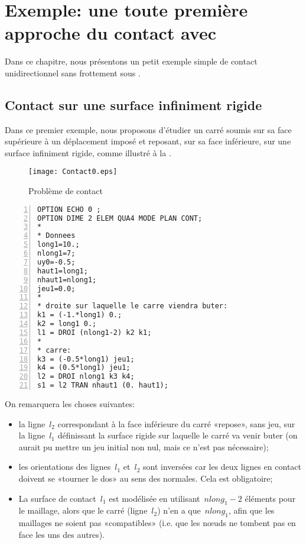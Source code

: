 \section{Exemple: une toute première approche du contact avec \castem}

Dans ce chapitre, nous présentons un petit exemple simple de contact unidirectionnel sans frottement sous \castem.

\medskip
\subsection{Contact sur une surface infiniment rigide}

Dans ce premier exemple, nous proposons d'étudier un carré soumis sur sa face supérieure à un déplacement imposé et reposant, sur sa face inférieure, sur une surface infiniment rigide, comme illustré à la .
\begin{figure}[ht]
  \center
  \texttt{[image: Contact0.eps]}
  \caption{\label{Fig-Cont0} Problème de contact}
\end{figure}

\color{gris}\scriptsize
\begin{multicols}{2}
\begin{Verbatim}[numbers=left,numbersep=3pt]
OPTION ECHO 0 ;
OPTION DIME 2 ELEM QUA4 MODE PLAN CONT;
*
* Donnees
long1=10.;
nlong1=7;
uy0=-0.5;
haut1=long1;
nhaut1=nlong1;
jeu1=0.0;
*
* droite sur laquelle le carre viendra buter:
k1 = (-1.*long1) 0.;
k2 = long1 0.;
l1 = DROI (nlong1-2) k2 k1;
*
* carre:
k3 = (-0.5*long1) jeu1;
k4 = (0.5*long1) jeu1;
l2 = DROI nlong1 k3 k4;
s1 = l2 TRAN nhaut1 (0. haut1);
\end{Verbatim}
\end{multicols}
\color{black}\normalsize

\medskip
On remarquera les choses suivantes:
\begin{itemize}
  \item la ligne~$l_2$ correspondant à la face inférieure du carré «repose», sans jeu, sur la ligne~$l_1$ définissant la surface rigide sur laquelle le carré va venir buter (on aurait pu mettre un jeu initial non nul, mais ce n'est pas nécessaire);
  \item les orientations des lignes~$l_1$ et~$l_2$ sont inversées car les deux lignes en contact doivent se  «tourner le dos» au sens des normales. Cela est obligatoire;
  \item La surface de contact~$l_1$ est modélisée en utilisant~$nlong_1-2$ éléments pour le maillage, alors que le carré (ligne~$l_2$) n'en a que~$nlong_1$, afin que les maillages ne soient pas «compatibles» (i.e. que les nœuds ne tombent pas en face les uns des autres).
\end{itemize}

